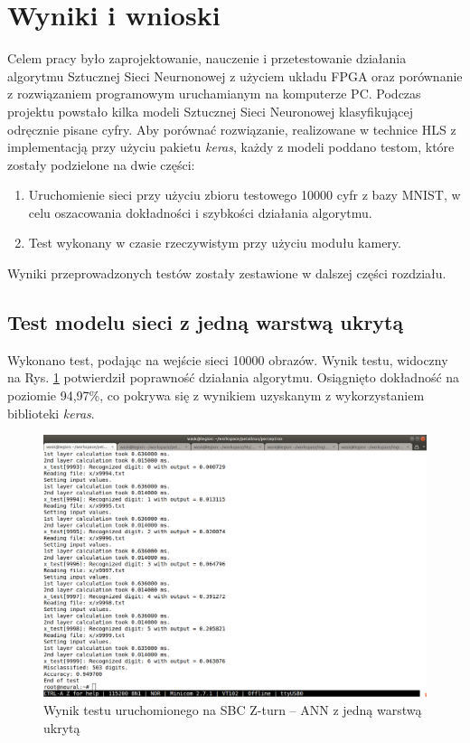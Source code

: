 \newpage %
\cleardoublepage %
\pagestyle{headings}

\section{Wyniki i wnioski}

Celem pracy było zaprojektowanie, nauczenie i przetestowanie działania algorytmu Sztucznej Sieci Neurnonowej z użyciem 
układu FPGA oraz porównanie z rozwiązaniem programowym uruchamianym na komputerze PC. Podczas projektu powstało kilka modeli Sztucznej Sieci 
Neuronowej klasyfikującej odręcznie pisane cyfry. Aby porównać rozwiązanie, realizowane w technice HLS z implementacją przy użyciu pakietu \emph{keras}, każdy z modeli poddano testom, które zostały podzielone na dwie części:
\bigskip
\begin{enumerate}
  \item Uruchomienie sieci przy użyciu zbioru testowego 10000 cyfr z bazy MNIST, w celu oszacowania dokładności i 
  szybkości działania algorytmu.
  \item Test wykonany w czasie rzeczywistym przy użyciu modułu kamery.
\end{enumerate}

Wyniki przeprowadzonych testów zostały zestawione w dalszej części rozdziału.

\subsection{Test modelu sieci z jedną warstwą ukrytą}

Wykonano test, podając na wejście sieci 10000 obrazów. Wynik testu, widoczny na Rys. \ref{wynik1} potwierdził poprawność działania algorytmu. Osiągnięto dokładność na poziomie 94,97\%, co pokrywa się z wynikiem uzyskanym z wykorzystaniem biblioteki \emph{keras}.

\begin{figure}[!h]
    \centering
    \includegraphics[width=\textwidth]{img/wynik1.png}
    \caption{Wynik testu uruchomionego na SBC Z-turn -- ANN z jedną warstwą ukrytą}
    \label{wynik1}
  \end{figure}


